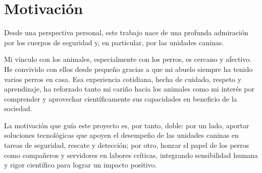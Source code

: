 \section{Motivación}
Desde una perspectiva personal, este trabajo nace de una profunda admiración por los cuerpos de seguridad y, en particular, por las unidades caninas. %
\par

Mi vínculo con los animales, especialmente con los perros, es cercano y afectivo. He convivido con ellos desde pequeño gracias a que mi abuelo siempre ha tenido varios perros en casa. Esa experiencia cotidiana, hecha de cuidado, respeto y aprendizaje, ha reforzado tanto mi cariño hacia los animales como mi interés por comprender y aprovechar científicamente sus capacidades en beneficio de la sociedad.
\par

La motivación que guía este proyecto es, por tanto, doble: por un lado, aportar soluciones tecnológicas que apoyen el desempeño de las unidades caninas en tareas de seguridad, rescate y detección; por otro, honrar el papel de los perros como compañeros y servidores en labores críticas, integrando sensibilidad humana y rigor científico para lograr un impacto positivo.
\par
